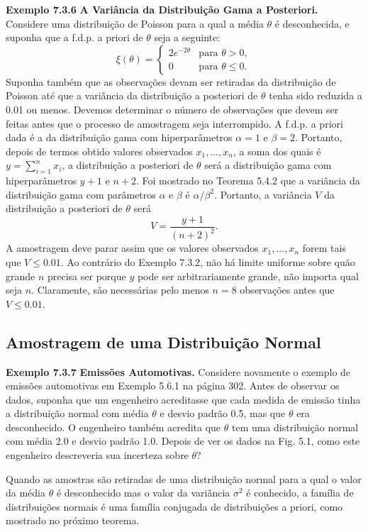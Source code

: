 \vspace{1cm}
\noindent\textbf{Exemplo 7.3.6} \quad \textbf{A Variância da Distribuição Gama a Posteriori.} Considere uma distribuição de Poisson para a qual a média $\theta$ é desconhecida, e suponha que a f.d.p. a priori de $\theta$ seja a seguinte:
$$ \xi(\theta) = 
\begin{cases}
2e^{-2\theta} & \text{para } \theta>0, \\
0 & \text{para } \theta \le 0.
\end{cases}
$$
Suponha também que as observações devam ser retiradas da distribuição de Poisson até que a variância da distribuição a posteriori de $\theta$ tenha sido reduzida a 0.01 ou menos. Devemos determinar o número de observações que devem ser feitas antes que o processo de amostragem seja interrompido.
A f.d.p. a priori dada é a da distribuição gama com hiperparâmetros $\alpha=1$ e $\beta=2$. Portanto, depois de termos obtido valores observados $x_1, \dots, x_n$, a soma dos quais é $y=\sum_{i=1}^{n}x_i$, a distribuição a posteriori de $\theta$ será a distribuição gama com hiperparâmetros $y+1$ e $n+2$. Foi mostrado no Teorema 5.4.2 que a variância da distribuição gama com parâmetros $\alpha$ e $\beta$ é $\alpha/\beta^2$. Portanto, a variância $V$ da distribuição a posteriori de $\theta$ será
$$ V = \frac{y+1}{(n+2)^2}. $$
A amostragem deve parar assim que os valores observados $x_1, \dots, x_n$ forem tais que $V \le 0.01$. Ao contrário do Exemplo 7.3.2, não há limite uniforme sobre quão grande $n$ precisa ser porque $y$ pode ser arbitrariamente grande, não importa qual seja $n$. Claramente, são necessárias pelo menos $n=8$ observações antes que $V \le 0.01$.

\subsection*{Amostragem de uma Distribuição Normal}

\noindent\textbf{Exemplo 7.3.7} \quad \textbf{Emissões Automotivas.} Considere novamente o exemplo de emissões automotivas em Exemplo 5.6.1 na página 302. Antes de observar os dados, suponha que um engenheiro acreditasse que cada medida de emissão tinha a distribuição normal com média $\theta$ e desvio padrão 0.5, mas que $\theta$ era desconhecido. O engenheiro também acredita que $\theta$ tem uma distribuição normal com média 2.0 e desvio padrão 1.0. Depois de ver os dados na Fig. 5.1, como este engenheiro descreveria sua incerteza sobre $\theta$?

\vspace{1cm}
Quando as amostras são retiradas de uma distribuição normal para a qual o valor da média $\theta$ é desconhecido mas o valor da variância $\sigma^2$ é conhecido, a família de distribuições normais é uma família conjugada de distribuições a priori, como mostrado no próximo teorema.

